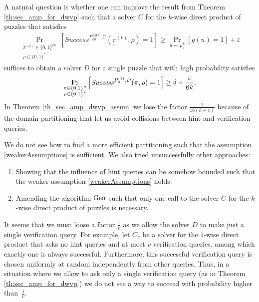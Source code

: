 A natural question is whether one can improve the result from Theorem \ref{th:sec_amp_for_dwvp}
such that a solver $C$ for the $k$-wise direct product of puzzles that satisfies
\begin{align}
    \label{weakerAssumptions}
    \underset{\substack{\pi^{(k)} \in \{0,1\}^{kn} \\ \rho \in \{0,1\}^{*}}}{\Pr}\left[\mathit{Success}^{P_{kn}^{(g)}, C}(\pi^{(k)}, \rho) = 1\right]
    \geq \underset{u \leftarrow \mu_\delta^k}{\Pr}[g(u) = 1] + \varepsilon
\end{align}
suffices to obtain a solver $D$ for a single puzzle that with high probability satisfies
  \begin{align}
    \underset{\substack{\pi \in \{0,1\}^{n} \\ \rho \in \{0,1\}^{*}}}
    {\Pr}\left[\operatorname{\mathit{Success}}^{P_{n}^{(1)},D}(\pi, \rho) = 1\right] \geq \delta + \frac{\varepsilon}{6k}.
  \end{align}
In Theorem \ref{th_sec_amp_dwvp_assum} we lose the factor $\frac{1}{16(h+v)}$ because of the domain partitioning that let us avoid collisions between hint and verification queries.

We do not see how to find a more efficient partitioning such that the assumption \eqref{weakerAssumptions} is sufficient.
We also tried unsuccessfully other approaches:
\begin{enumerate}[-]
  \item Showing that the influence of hint queries can be somehow bounded such that the weaker assumption \eqref{weakerAssumptions} holds. \\
  \item Amending the algorithm $\operatorname{\text{Gen}}$ such that only one call to the solver $C$ for the $k$-wise direct product of puzzles is necessary.
\end{enumerate}

It seems that we must loose a factor $\frac{1}{v}$ as we allow the solver $D$ to make just a single verification query.
For example, let $C_v$ be a solver for the $1$-wise direct product that asks no hint queries and at most $v$ verification queries.
among which exactly one is always successful.
Furthermore, this successful verification query is chosen uniformly at random independently from other queries.
Thus, in a situation where we allow to ask only a single verification query (as in Theorem \ref{th:sec_amp_for_dwvp})
we do not see a way to succeed with probability higher than~$\frac{1}{v}$.

